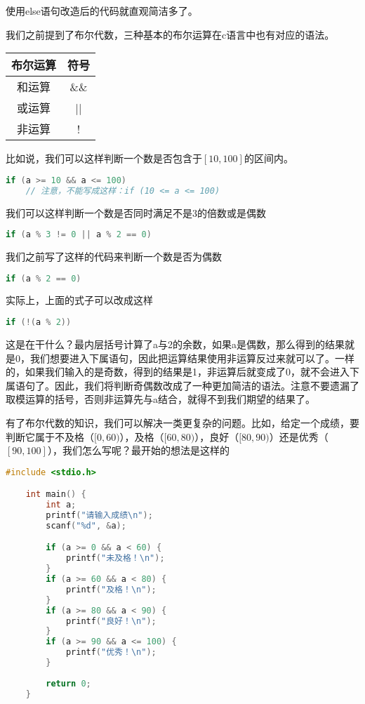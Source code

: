 使用else语句改造后的代码就直观简洁多了。

我们之前提到了布尔代数，三种基本的布尔运算在c语言中也有对应的语法。

\begin{longtable}{c|c}
    布尔运算 & 符号\\
    \hline
    和运算 & \&\&\\
    \hline
    或运算 & ||\\
    \hline
    非运算 & !\\ 
\end{longtable}

比如说，我们可以这样判断一个数是否包含于$[10, 100]$的区间内。

\begin{lstlisting}[language=C]
    if (a >= 10 && a <= 100)
    // 注意，不能写成这样：if (10 <= a <= 100)
\end{lstlisting}

我们可以这样判断一个数是否同时满足不是3的倍数或是偶数

\begin{lstlisting}[language=C]
    if (a % 3 != 0 || a % 2 == 0)
\end{lstlisting}

我们之前写了这样的代码来判断一个数是否为偶数

\begin{lstlisting}[language=C]
    if (a % 2 == 0)
\end{lstlisting}

实际上，上面的式子可以改成这样

\begin{lstlisting}[language=C]
    if (!(a % 2))
\end{lstlisting}

这是在干什么？最内层括号计算了a与2的余数，如果a是偶数，那么得到的结果就是0，我们想要进入下属语句，因此把运算结果使用非运算反过来就可以了。一样的，如果我们输入的是奇数，得到的结果是1，非运算后就变成了0，就不会进入下属语句了。因此，我们将判断奇偶数改成了一种更加简洁的语法。注意不要遗漏了取模运算的括号，否则非运算先与a结合，就得不到我们期望的结果了。

有了布尔代数的知识，我们可以解决一类更复杂的问题。比如，给定一个成绩，要判断它属于不及格（$[0, 60)$），及格（$[60, 80)$），良好（$[80, 90)$）还是优秀（$[90, 100]$），我们怎么写呢？最开始的想法是这样的

\begin{lstlisting}[language=C]
    #include <stdio.h>

    int main() {
        int a;
        printf("请输入成绩\n");
        scanf("%d", &a);

        if (a >= 0 && a < 60) {
            printf("未及格！\n");
        }
        if (a >= 60 && a < 80) {
            printf("及格！\n");
        }
        if (a >= 80 && a < 90) {
            printf("良好！\n");
        }
        if (a >= 90 && a <= 100) {
            printf("优秀！\n");
        }
        
        return 0;
    }
\end{lstlisting}

